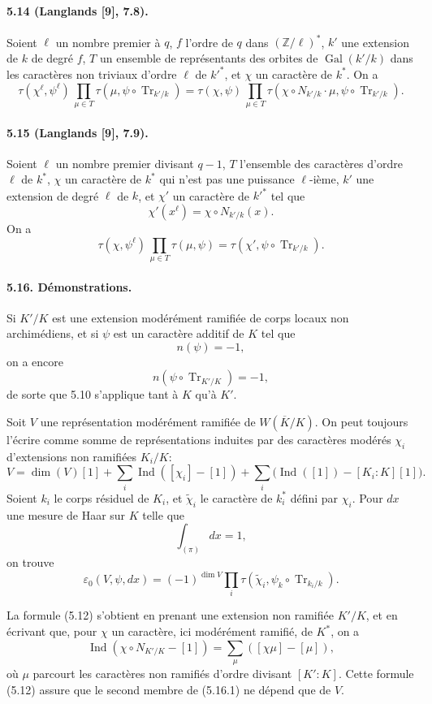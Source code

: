\documentclass[10pt]{article}
\newcommand{\Gal}{\operatorname{Gal}}
\newcommand{\Ind}{\operatorname{Ind}}
\newcommand{\Tr}{\operatorname{Tr}}
\providecommand{\Gal}{\operatorname{Gal}}
\providecommand{\Gal}{\operatorname{Gal}}
\providecommand{\Tr}{\operatorname{Tr}}
\providecommand{\Gal}{\operatorname{Gal}}
\providecommand{\Tr}{\operatorname{Tr}}
\providecommand{\Gal}{\operatorname{Gal}}
\providecommand{\Tr}{\operatorname{Tr}}
\providecommand{\Ind}{\operatorname{Ind}}
\begin{document}
\paragraph{5.14 (Langlands [9], 7.8).} Soient \(\ell\) un nombre premier à \(q\), \(f\) l'ordre de \(q\) dans \((\mathbb Z/\ell)^*\), \(k'\) une extension de \(k\) de degré \(f\), \(T\) un ensemble de représentants des orbites de \(\Gal(k'/k)\) dans les caractères non triviaux d'ordre \(\ell\) de \(k'^*\), et \(\chi\) un caractère de \(k^*\). On a
\[
\tau(\chi^\ell,\psi^\ell)\,
\prod_{\mu\in T}\tau(\mu,\psi\circ\Tr_{k'/k})
=
\tau(\chi,\psi)\,
\prod_{\mu\in T}\tau(\chi\circ N_{k'/k}\cdot\mu,\psi\circ\Tr_{k'/k}).
\]

\paragraph{5.15 (Langlands [9], 7.9).} Soient \(\ell\) un nombre premier divisant \(q-1\), \(T\) l'ensemble des caractères d'ordre \(\ell\) de \(k^*\), \(\chi\) un caractère de \(k^*\) qui n'est pas une puissance \(\ell\)-ième, \(k'\) une extension de degré \(\ell\) de \(k\), et \(\chi'\) un caractère de \(k'^*\) tel que
\[
\chi'(x^\ell)=\chi\circ N_{k'/k}(x).
\]
On a
\[
\tau(\chi,\psi^\ell)\,
\prod_{\mu\in T}\tau(\mu,\psi)
=
\tau(\chi',\psi\circ\Tr_{k'/k}).
\]

\paragraph{5.16. Démonstrations.} Si \(K'/K\) est une extension modérément ramifiée de corps locaux non archimédiens, et si \(\psi\) est un caractère additif de \(K\) tel que
\[
n(\psi)=-1,
\]
on a encore
\[
n(\psi\circ\Tr_{K'/K})=-1,
\]
de sorte que 5.10 s'applique tant à \(K\) qu'à \(K'\).

Soit \(V\) une représentation modérément ramifiée de \(W(\overline K/K)\). On peut toujours l'écrire comme somme de représentations induites par des caractères modérés \(\chi_i\) d'extensions non ramifiées \(K_i/K\):
\[
V=\dim(V)[1]+\sum_i\Ind([\chi_i]-[1])
+\sum_i\bigl(\Ind([1])-[K_i:K][1]\bigr).
\]
Soient \(k_i\) le corps résiduel de \(K_i\), et \(\widetilde\chi_i\) le caractère de \(k_i^*\) défini par \(\chi_i\). Pour \(dx\) une mesure de Haar sur \(K\) telle que
\[
\int_{(\pi)}dx=1,
\]
on trouve
\[
\tag{5.16.1}
\varepsilon_0(V,\psi,dx)
=
(-1)^{\dim V}
\prod_i\tau(\widetilde\chi_i,\psi_k\circ\Tr_{k_i/k}).
\]

La formule (5.12) s'obtient en prenant une extension non ramifiée \(K'/K\), et en écrivant que, pour \(\chi\) un caractère, ici modérément ramifié, de \(K^*\), on a
\[
\Ind(\chi\circ N_{K'/K}-[1])
=
\sum_\mu([\chi\mu]-[\mu]),
\]
où \(\mu\) parcourt les caractères non ramifiés d'ordre divisant \([K':K]\). Cette formule (5.12) assure que le second membre de (5.16.1) ne dépend que de \(V\).
\end{document}

